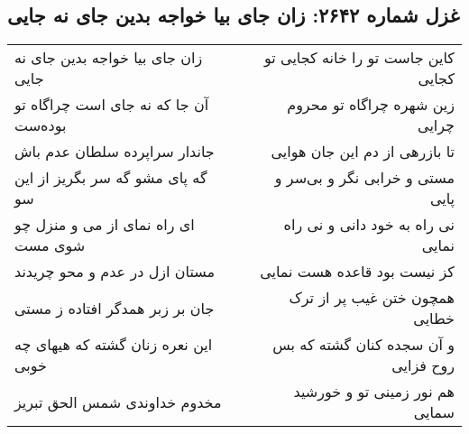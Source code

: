 \begin{center}
\section*{غزل شماره ۲۶۴۲: زان جای بیا خواجه بدین جای نه جایی}
\label{sec:2642}
\begin{longtable}{l p{0.5cm} r}
زان جای بیا خواجه بدین جای نه جایی
&&
کاین جاست تو را خانه کجایی تو کجایی
\\
آن جا که نه جای است چراگاه تو بوده‌ست
&&
زین شهره چراگاه تو محروم چرایی
\\
جاندار سراپرده سلطان عدم باش
&&
تا بازرهی از دم این جان هوایی
\\
گه پای مشو گه سر بگریز از این سو
&&
مستی و خرابی نگر و بی‌سر و پایی
\\
ای راه نمای از می و منزل چو شوی مست
&&
نی راه به خود دانی و نی راه نمایی
\\
مستان ازل در عدم و محو چریدند
&&
کز نیست بود قاعده هست نمایی
\\
جان بر زبر همدگر افتاده ز مستی
&&
همچون ختن غیب پر از ترک خطایی
\\
این نعره زنان گشته که هیهای چه خوبی
&&
و آن سجده کنان گشته که بس روح فزایی
\\
مخدوم خداوندی شمس الحق تبریز
&&
هم نور زمینی تو و خورشید سمایی
\\
\end{longtable}
\end{center}
